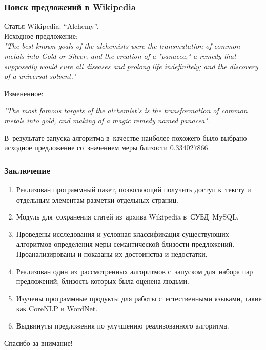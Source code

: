 \documentclass{beamer}
\begin{document}
\begin{frame}
\frametitle{Поиск предложений в Wikipedia}

\vspace{0.2cm}
Статья Wikipedia: ``Alchemy''.\\
Исходное предложение:\\
\textit{"The best known goals of the alchemists were the transmutation of common metals into Gold or Silver, and the creation of a "panacea," a remedy that supposedly would cure all diseases and prolong life indefinitely; and the discovery of a universal solvent."}

Измененное:

\textit{"The most famous targets of the alchemist's is the transformation of common metals into gold, and making of a magic remedy named panacea".}

В~результате запуска алгоритма в~качестве наиболее похожего 
было выбрано исходное предложение со~значением меры близости $0.334027866$.
\end{frame}

\begin{frame}
\frametitle{Заключение}

\begin{enumerate}
\item {
Реализован программный пакет, позволяющий получить доступ к~тексту
и отдельным элементам разметки отдельных страниц.
}
\item {
Модуль для~сохранения статей из~архива Wikipedia
в~СУБД~MySQL.
}
\item {
Проведены исследования и условная классификация существующих 
алгоритмов определения меры семантической близости предложений. 
Проанализированы и показаны их достоинства и недостатки.
}
\item {
Реализован один из~рассмотренных алгоритмов с~запуском для~набора 
пар предложений, близость которых была оценена людьми. 
}
\item {
Изучены программные продукты для работы
с~естественными языками, такие как CoreNLP и WordNet.
} 
\item {
Выдвинуты предложения по улучшению реализованного алгоритма.
}
\end{enumerate}
\end{frame}

\begin{frame}
{\Large Спасибо за внимание!}
\end{frame}
\end{document}
